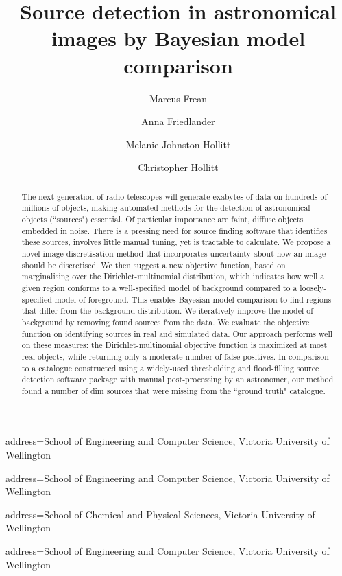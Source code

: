 \documentclass[
    ,final            %
  ]
  {aipproc}
\begin{document}
\title{Source detection in astronomical images by Bayesian model comparison}


\author{Marcus Frean}{
  address={School of Engineering and Computer Science, Victoria University of Wellington}
}

\author{Anna Friedlander}{
  address={School of Engineering and Computer Science, Victoria University of Wellington}
}

\author{Melanie Johnston-Hollitt}{
  address={School of Chemical and Physical Sciences, Victoria University of Wellington}
}

\author{Christopher Hollitt}{
  address={School of Engineering and Computer Science, Victoria University of Wellington}
}

\begin{abstract}
The next generation of radio telescopes will generate exabytes of data on hundreds of millions of objects, making automated methods for the detection of astronomical objects (``sources") essential. Of particular importance are faint, diffuse objects embedded in noise. There is a pressing need for source finding software that identifies these sources, involves little manual tuning, yet is tractable to calculate.  We propose a novel image discretisation method that incorporates uncertainty about how an image should be discretised. We then suggest a new objective function, based on marginalising over the Dirichlet-multinomial distribution, which indicates how well a given region conforms to a well-specified model of background compared to a loosely-specified model of foreground. This enables Bayesian model comparison to find regions that differ from the background distribution. We iteratively improve the model of background by removing found sources from the data. We evaluate the objective function on identifying sources in real and simulated data. Our approach performs well on these measures: the Dirichlet-multinomial objective function is maximized at most real objects, while returning only a moderate number of false positives. In comparison to a catalogue constructed using a widely-used thresholding and flood-filling source detection software package with manual post-processing by an astronomer, our method found a number of dim sources that were missing from the ``ground truth" catalogue. %
\end{abstract}
\end{document}
